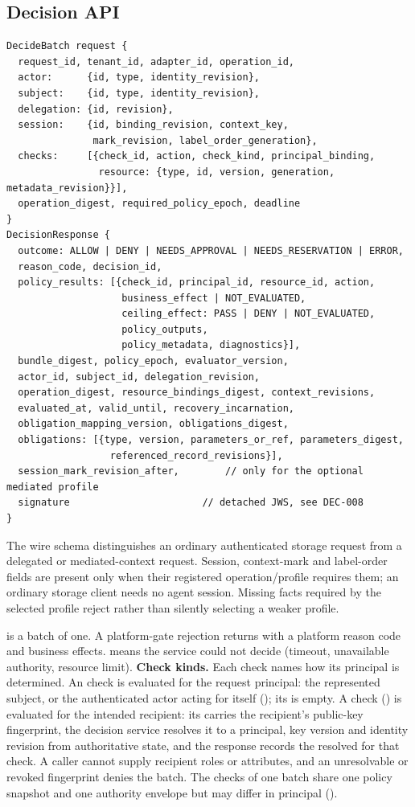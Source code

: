 \subsection{Decision API}\label{sec:decisionapi}
\begin{lstlisting}
DecideBatch request {
  request_id, tenant_id, adapter_id, operation_id,
  actor:      {id, type, identity_revision},
  subject:    {id, type, identity_revision},
  delegation: {id, revision},
  session:    {id, binding_revision, context_key,
               mark_revision, label_order_generation},
  checks:     [{check_id, action, check_kind, principal_binding,
                resource: {type, id, version, generation, metadata_revision}}],
  operation_digest, required_policy_epoch, deadline
}
DecisionResponse {
  outcome: ALLOW | DENY | NEEDS_APPROVAL | NEEDS_RESERVATION | ERROR,
  reason_code, decision_id,
  policy_results: [{check_id, principal_id, resource_id, action,
                    business_effect | NOT_EVALUATED,
                    ceiling_effect: PASS | DENY | NOT_EVALUATED,
                    policy_outputs,
                    policy_metadata, diagnostics}],
  bundle_digest, policy_epoch, evaluator_version,
  actor_id, subject_id, delegation_revision,
  operation_digest, resource_bindings_digest, context_revisions,
  evaluated_at, valid_until, recovery_incarnation,
  obligation_mapping_version, obligations_digest,
  obligations: [{type, version, parameters_or_ref, parameters_digest,
                  referenced_record_revisions}],
  session_mark_revision_after,        // only for the optional mediated profile
  signature                       // detached JWS, see DEC-008
}
\end{lstlisting}
The wire schema distinguishes an ordinary authenticated storage request from a delegated or mediated-context request. Session, context-mark and label-order fields are present only when their registered operation/profile requires them; an ordinary storage client needs no agent session. Missing facts required by the selected profile reject rather than silently selecting a weaker profile.

 is a batch of one. A platform-gate rejection returns  with a platform reason code and  business effects.  means the service could not decide (timeout, unavailable authority, resource limit).
\textbf{Check kinds.} Each check names how its principal is determined. An  check is evaluated for the request principal: the represented subject, or the authenticated actor acting for itself (); its  is empty. A  check () is evaluated for the intended recipient: its  carries the recipient's public-key fingerprint, the decision service resolves it to a principal, key version and identity revision from authoritative state, and the response records the resolved  for that check. A caller cannot supply recipient roles or attributes, and an unresolvable or revoked fingerprint denies the batch. The checks of one batch share one policy snapshot and one authority envelope but may differ in principal ().

